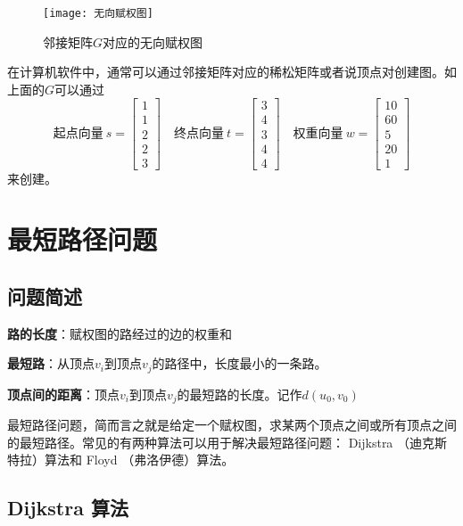 \documentclass[withoutpreface]{cumcmthesis}
\begin{document}
\begin{figure}[H]
  \centering
  \texttt{[image: 无向赋权图]}
  \caption{邻接矩阵$G$对应的无向赋权图}\label{Fig:5}
\end{figure}

在计算机软件中，通常可以通过邻接矩阵对应的稀松矩阵或者说顶点对创建图。如上面的$G$可以通过$$\mbox{起点向量}\ s = \begin{bmatrix}
    1 \\ 1\\ 2\\ 2\\ 3
  \end{bmatrix} \quad \mbox{终点向量}\ t=\begin{bmatrix}
    3 \\ 4\\ 3\\ 4\\ 4
  \end{bmatrix}
  \quad \mbox{权重向量}\ w = \begin{bmatrix}
    10 \\ 60 \\ 5 \\ 20 \\ 1
  \end{bmatrix}$$
来创建。

\section{最短路径问题}

\subsection{问题简述}

\textbf{路的长度}：赋权图的路经过的边的权重和

\textbf{最短路}：从顶点$v_i$到顶点$v_j$的路径中，长度最小的一条路。

\textbf{顶点间的距离}：顶点$v_i$到顶点$v_j$的最短路的长度。记作$d(u_0,v_0)$

最短路径问题，简而言之就是给定一个赋权图，求某两个顶点之间或所有顶点之间的最短路径。常见的有两种算法可以用于解决最短路径问题： Dijkstra （迪克斯特拉）算法和 Floyd （弗洛伊德）算法。

\vspace{-0.5cm}
\subsection{Dijkstra 算法}
\end{document}
